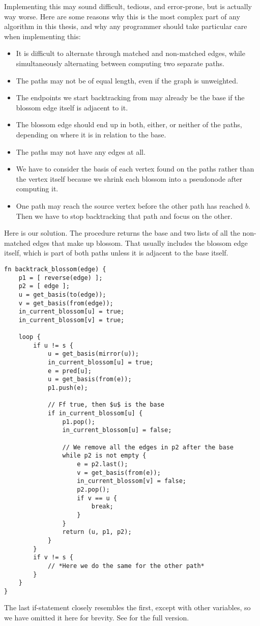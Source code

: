 Implementing this may sound difficult, tedious, and error-prone, but is actually way worse. Here are some reasons why this is the most complex part of any algorithm in this thesis, and why any programmer should take particular care when implementing this:
\begin{itemize}
    \item It is difficult to alternate through matched and non-matched edges, while simultaneously alternating between computing two separate paths.
    \item The paths may not be of equal length, even if the graph is unweighted.
    \item The endpoints we start backtracking from may already be the base if the blossom edge itself is adjacent to it.
    \item The blossom edge should end up in both, either, or neither of the paths, depending on where it is in relation to the base.
    \item The paths may not have any edges at all.
    \item We have to consider the basis of each vertex found on the paths rather than the vertex itself because we shrink each blossom into a pseudonode after computing it.
    \item One path may reach the source vertex before the other path has reached $b$. Then we have to stop backtracking that path and focus on the other.
\end{itemize}

Here is our solution. The procedure returns the base and two lists of all the non-matched edges that make up blossom. That usually includes the blossom edge itself, which is part of both paths unless it is adjacent to the base itself.
\begin{lstlisting}[caption={Backtrack blossom},label=Listing,mathescape=true]
fn backtrack_blossom(edge) {
    p1 = [ reverse(edge) ];
    p2 = [ edge ];
    u = get_basis(to(edge));
    v = get_basis(from(edge));
    in_current_blossom[u] = true;
    in_current_blossom[v] = true;

    loop {
        if u != s {
            u = get_basis(mirror(u));
            in_current_blossom[u] = true;
            e = pred[u];
            u = get_basis(from(e));
            p1.push(e);

            // Ff true, then $u$ is the base
            if in_current_blossom[u] { 
                p1.pop();
                in_current_blossom[u] = false;

                // We remove all the edges in p2 after the base
                while p2 is not empty {
                    e = p2.last();
                    v = get_basis(from(e));
                    in_current_blossom[v] = false;
                    p2.pop();
                    if v == u {
                        break;
                    }
                }
                return (u, p1, p2);
            }
        }
        if v != s {
            // *Here we do the same for the other path*
        }
    }
}
\end{lstlisting}
The last if-statement closely resembles the first, except with other variables, so we have omitted it here for brevity. See  for the full version.

